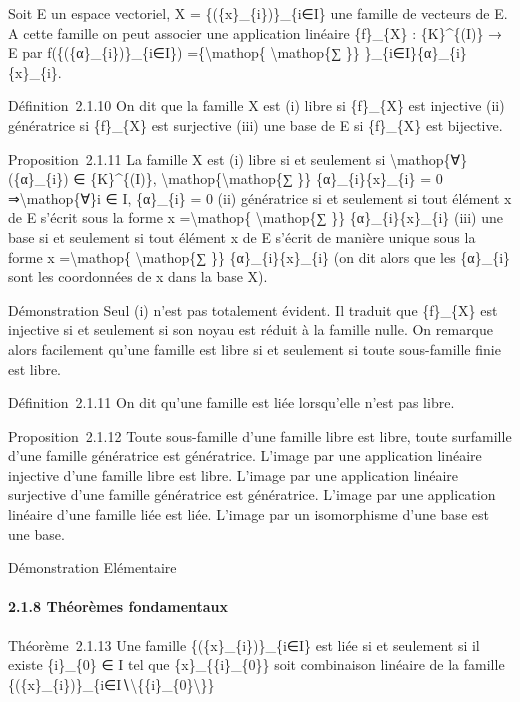 \documentclass[]{article}
\begin{document}
Soit E un espace vectoriel, X = \{(\{x\}\_\{i\})\}\_\{i∈I\} une famille
de vecteurs de E. A cette famille on peut associer une application
linéaire \{f\}\_\{X\} : \{K\}\^{}\{(I)\} → E par
f(\{(\{α\}\_\{i\})\}\_\{i∈I\}) =\{\textbackslash{}mathop\{
\textbackslash{}mathop\{∑ \}\} \}\_\{i∈I\}\{α\}\_\{i\}\{x\}\_\{i\}.

Définition~2.1.10 On dit que la famille X est (i) libre si \{f\}\_\{X\}
est injective (ii) génératrice si \{f\}\_\{X\} est surjective (iii) une
base de E si \{f\}\_\{X\} est bijective.

Proposition~2.1.11 La famille X est (i) libre si et seulement si
\textbackslash{}mathop\{∀\}(\{α\}\_\{i\}) ∈ \{K\}\^{}\{(I)\},
\textbackslash{}mathop\{\textbackslash{}mathop\{∑ \}\}
\{α\}\_\{i\}\{x\}\_\{i\} = 0 ⇒\textbackslash{}mathop\{∀\}i ∈ I,
\{α\}\_\{i\} = 0 (ii) génératrice si et seulement si tout élément x de E
s'écrit sous la forme x =\textbackslash{}mathop\{
\textbackslash{}mathop\{∑ \}\} \{α\}\_\{i\}\{x\}\_\{i\} (iii) une base
si et seulement si tout élément x de E s'écrit de manière unique sous la
forme x =\textbackslash{}mathop\{ \textbackslash{}mathop\{∑ \}\}
\{α\}\_\{i\}\{x\}\_\{i\} (on dit alors que les \{α\}\_\{i\} sont les
coordonnées de x dans la base X).

Démonstration Seul (i) n'est pas totalement évident. Il traduit que
\{f\}\_\{X\} est injective si et seulement si son noyau est réduit à la
famille nulle. On remarque alors facilement qu'une famille est libre si
et seulement si toute sous-famille finie est libre.

Définition~2.1.11 On dit qu'une famille est liée lorsqu'elle n'est pas
libre.

Proposition~2.1.12 Toute sous-famille d'une famille libre est libre,
toute surfamille d'une famille génératrice est génératrice. L'image par
une application linéaire injective d'une famille libre est libre.
L'image par une application linéaire surjective d'une famille
génératrice est génératrice. L'image par une application linéaire d'une
famille liée est liée. L'image par un isomorphisme d'une base est une
base.

Démonstration Elémentaire

\paragraph{2.1.8 Théorèmes fondamentaux}

Théorème~2.1.13 Une famille \{(\{x\}\_\{i\})\}\_\{i∈I\} est liée si et
seulement si il existe \{i\}\_\{0\} ∈ I tel que \{x\}\_\{\{i\}\_\{0\}\}
soit combinaison linéaire de la famille
\{(\{x\}\_\{i\})\}\_\{i∈I∖\textbackslash{}\{\{i\}\_\{0\}\textbackslash{}\}\}
\end{document}
